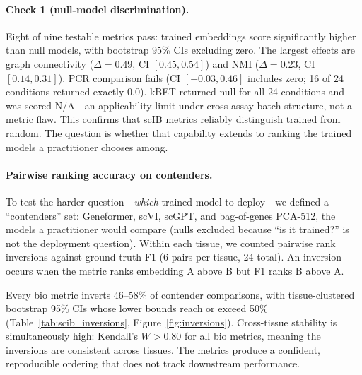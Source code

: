 \documentclass[10pt,letterpaper]{article}
\begin{document}
\paragraph{Check 1 (null-model discrimination).} Eight of nine testable metrics pass: trained embeddings score significantly higher than null models, with bootstrap 95\% CIs excluding zero. The largest effects are graph connectivity ($\Delta = 0.49$, CI $[0.45, 0.54]$) and NMI ($\Delta = 0.23$, CI $[0.14, 0.31]$). PCR comparison fails (CI $[-0.03, 0.46]$ includes zero; 16 of 24 conditions returned exactly 0.0). kBET returned null for all 24 conditions and was scored N/A---an applicability limit under cross-assay batch structure, not a metric flaw. This confirms that scIB metrics reliably distinguish trained from random. The question is whether that capability extends to ranking the trained models a practitioner chooses among.

\paragraph{Pairwise ranking accuracy on contenders.} To test the harder question---\emph{which} trained model to deploy---we defined a ``contenders'' set: Geneformer, scVI, scGPT, and bag-of-genes PCA-512, the models a practitioner would compare (nulls excluded because ``is it trained?'' is not the deployment question). Within each tissue, we counted pairwise rank inversions against ground-truth F1 (6 pairs per tissue, 24 total). An inversion occurs when the metric ranks embedding A above B but F1 ranks B above A.

Every bio metric inverts 46--58\% of contender comparisons, with tissue-clustered bootstrap 95\% CIs whose lower bounds reach or exceed 50\% (Table~\ref{tab:scib_inversions}, Figure~\ref{fig:inversions}). Cross-tissue stability is simultaneously high: Kendall's $W > 0.80$ for all bio metrics, meaning the inversions are consistent across tissues. The metrics produce a confident, reproducible ordering that does not track downstream performance.
\end{document}
